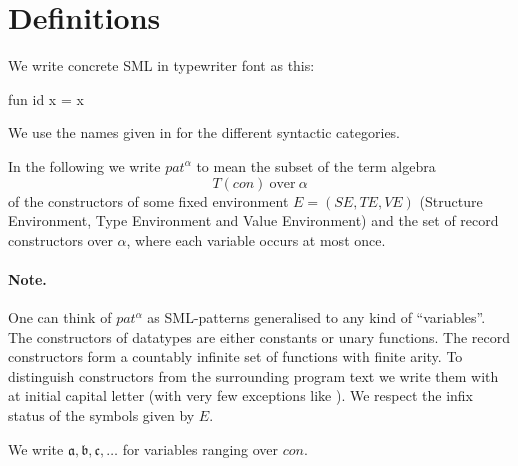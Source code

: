 \section{Definitions}
We write concrete SML in typewriter font as this:
\begin{sml}
fun id x = x
\end{sml}

We use the names given in \cite{SML97} for the different syntactic categories.

\begin{definition}
  In the following we write $pat^\alpha$ to mean the subset of the term algebra
  \[
  T(con)\ \text{over}\ \alpha
  \]
  of the constructors of some fixed environment $E = (S\!E, T\!E, V\!E)$
  (Structure Environment, Type Environment and Value Environment) and the set of
  record constructors over $\alpha$, where each variable occurs at most
  once. 

\end{definition}

\paragraph{Note.} One can think of $pat^\alpha$ as SML-patterns generalised to
any kind of ``variables''. The constructors of datatypes are either constants or
unary functions. The record constructors form a countably infinite set of
functions with finite arity. To distinguish constructors from the surrounding
program text we write them with at initial capital letter (with very few
exceptions like \codeinline{::} ). We respect the infix status
of the symbols given by $E$.

We write $\mathfrak{a}, \mathfrak{b}, \mathfrak{c}, \ldots$ for variables
ranging over $con$.


